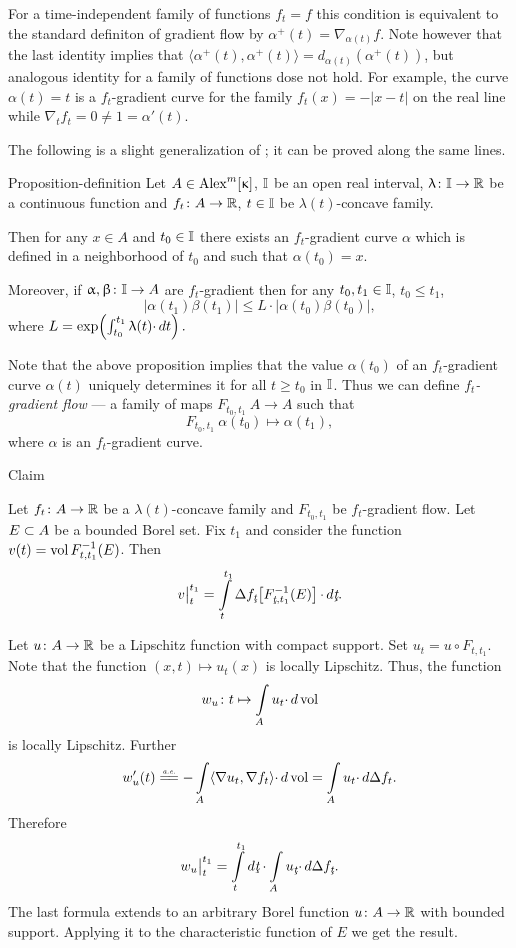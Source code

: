 \documentclass[oneside,a4paper]{article}
\begin{document}
For a time-independent family of functions $f_t=f$ this condition is equivalent to the standard definiton of gradient flow by $\alpha^+(t)=\nabla_{\alpha(t)} f$.
Note however that the last identity implies that $\langle\alpha^+(t),\alpha^+(t)\rangle=d_{\alpha(t)}(\alpha^+(t))$, but analogous identity for a family of functions dose not hold.
For example, the curve $\alpha(t)=t$ is a $f_t$-gradient curve for the family $f_t(x)=-|x-t|$ on the real line while $\nabla_t f_t=0\ne 1=\alpha'(t)$.

The following is a slight generalization of \cite[2.1.2$\&$2.2(2)]{petrunin:survey}; it can be proved along the same lines.

\begin{thm}{Proposition-definition}\label{prop-def}
Let $A\in\CBB m\kappa$,
$\mathbb{I}$ be an open real interval, 
$\uplambda\colon\mathbb{I}\to\mathbb{R}$ be a continuous function and 
$f_t\colon A\to \mathbb{R}$, $t\in \mathbb{I}$ be $\lambda(t)$-concave family.

Then for any $x\in A$ and $t_0\in \mathbb{I}$ there exists an $f_t$-gradient curve $\alpha$ which is defined in a neighborhood of $t_0$ and such that $\alpha(t_0)=x$.

Moreover, if $\upalpha,\upbeta\colon\mathbb{I}\to A$ are $f_t$-gradient then for any $t_0,t_1\in\mathbb{I}$, $t_0\le t_1$,
$$|\alpha(t_1)\beta(t_1)|\le L{\cdot}|\alpha(t_0)\beta(t_0)|,$$
where $L=\exp\!\left(\int_{t_0}^{t_1}\uplambda(t){\cdot}\,d t\right).$
\end{thm}

Note that the above proposition implies that the value $\alpha(t_0)$ of an $f_t$-gradient curve $\alpha(t)$ uniquely determines it for all $t\ge t_0$ in $\mathbb{I}$. 
Thus we can define \emph{$f_t$-gradient flow} --- a family of maps $F_{{t_0},{t_1}}\: A\to A$ such that
$$F_{{t_0},{t_1}}\:\alpha(t_0)\mapsto\alpha(t_1),$$
where $\alpha$ is an $f_t$-gradient curve.

\begin{thm}{Claim}\label{vol-lap}
{\sloppy Let $f_t\colon A\to\mathbb{R}$ be a $\lambda(t)$-concave family and $F_{{t_0},{t_1}}$ be $f_t$-gradient flow.
Let $E\subset A$ be a bounded Borel set. 
Fix $t_1$ and consider the function 
\hbox{$v(t)=\mathop{\rm vol}\nolimits F^{-1}_{{t},{t_1}}(E)$}.
Then 
$$\bigl.v\bigr|_t^{t_1}
=
\int\limits_t^{t_1}\Lap f_\under{t}\l[F^{-1}_{\under{t},{t_1}}(E)\r]{\cdot}\,d\under{t}.$$

}
\end{thm}

Let $u\colon A\to\mathbb{R}$ be a Lipschitz function with compact support.
Set $u_t=u\circ F_{{t},{t_1}}$.
Note that the function $(x,t)\mapsto u_t(x)$ is locally Lipschitz.
Thus, the function 
$$w_u\colon t\mapsto \int\limits_A u_t{\cdot}\,d\mathop{\rm vol}\nolimits$$ 
is locally Lipschitz.
Further
$$w_u'(t)\ae
-\int\limits_A \<\nabla u_t,\nabla f_t\>{\cdot}\,d\vol
=
\int\limits_A u_t{\cdot}\, d\Lap f_t.$$
Therefore 
$$\bigl.w_u\bigr|_t^{t_1}
=
\int\limits_t^{t_1}d\under{t}\cdot\int\limits_A u_{\under{t}}{\cdot}\,d\Lap f_{\under{t}}.$$
The last formula extends to an arbitrary Borel function $u\colon A\to\mathbb{R}$ with bounded support.
Applying it to the characteristic function of $E$ we get the result.
\qeds
\end{document}
